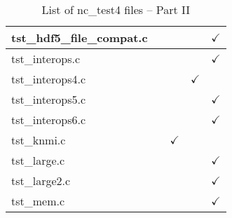 \begin{table}[H]
\begin{tabular}{|l|c|c|c|c|}
tst\_hdf5\_file\_compat.c   &  &   &   & $\checkmark$    \\ \hline
tst\_interops.c   &  &   &   & $\checkmark$    \\ \hline
tst\_interops4.c   &  &   &  $\checkmark$ &    \\ \hline
tst\_interops5.c   &  &   &   & $\checkmark$    \\ \hline
tst\_interops6.c   &  &   &   & $\checkmark$    \\ \hline
tst\_knmi.c   &  & $\checkmark$  &   &    \\ \hline
tst\_large.c   &  &   &   & $\checkmark$    \\ \hline
tst\_large2.c   &  &   &   & $\checkmark$    \\ \hline
tst\_mem.c   &  &   &   & $\checkmark$    \\ \hline
\hline
\end{tabular}
\caption{List of nc\_test4 files -- Part II}
\end{table}

